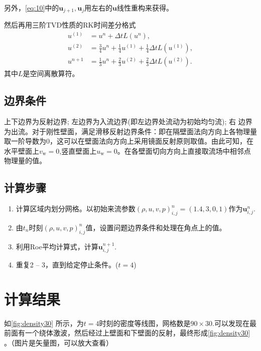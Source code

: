 \documentclass[12pt]{article}
\begin{document}
另外，\cref{eq:10}中的$\bm{u}_{j+1},\bm{u}_{j}$用左右的$\bm{u}$线性重构来获得。

然后再用三阶TVD性质的RK时间差分格式
\begin{equation}
	\begin{aligned}
		{u}^{(1)} & ={u}^{n}+\Delta t L\left({u}^{n}\right)    ,                                             \\
		{u}^{(2)} & =\frac{3}{4} {u}^{n}+\frac{1}{4} {u}^{(1)}+\frac{1}{4} \Delta t L\left({u}^{(1)}\right), \\
		{u}^{n+1} & =\frac{1}{3} {u}^{n}+\frac{2}{3} {u}^{(2)}+\frac{2}{3} \Delta t L\left({u}^{(2)}\right).
	\end{aligned}
	\label{eq:11}
\end{equation}
其中$L$是空间离散算符。


\subsection{边界条件}

上下边界为反射边界; 左边界为入流边界(即左边界处流动为初始均匀流); 右 边界为出流。对于刚性壁面，满足滑移反射边界条件：即在隔壁面法向方向上各物理量取一阶导数为0，这可以在壁面法向方向上采用镜面反射原则取值。由此可知，在水平壁面上$v_{\mathrm{w}}=0$,竖直壁面上$u_{\mathrm{w}}=0$。在各壁面切向方向上直接取流场中相邻点物理量的值。\cite[P339]{cfd}


\subsection{计算步骤}

\begin{enumerate}
	\item 计算区域内划分网格。以初始来流参数$(\rho,u,v,p)^n_{i,j} = (1.4,3,0,1)$作为$\bm{u}^n_{i,j}$.
	\item 由$t_n$时刻$(\rho,u,v,p)^n_{i,j}$值，设置问题边界条件和处理在角点上的值。
	\item 利用Roe平均计算式，计算$\bm{u}^{n+1}_{i,j}$.
	\item 重复2 -- 3，直到给定停止条件。($t=4$)
\end{enumerate}

\section{计算结果}

如\cref{fig:density30} 所示，为$t=4$时刻的密度等线图，网格数是$90\times 30$.可以发现在最前面有一个绕体激波，然后经过上壁面和下壁面的反射，最终形成\cref{fig:density30} 。（图片是矢量图，可以放大查看）
\end{document}
